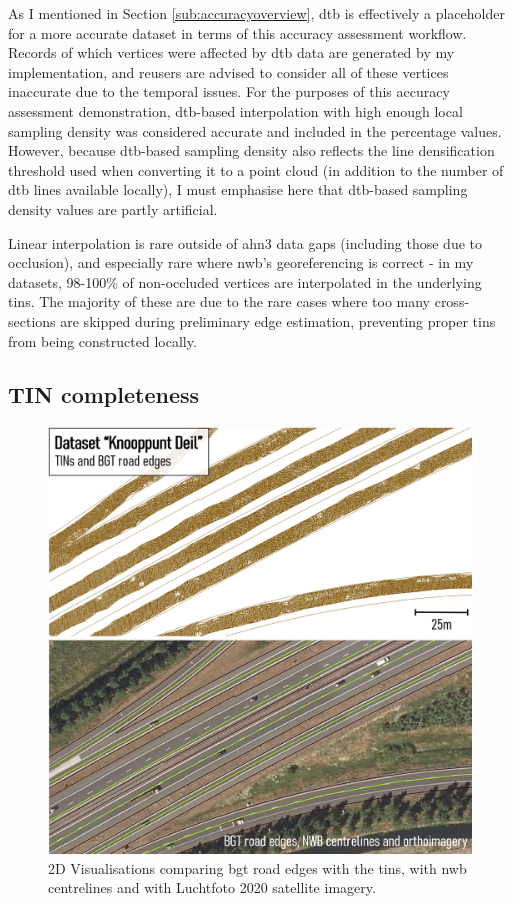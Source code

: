 As I mentioned in Section \ref{sub:accuracyoverview}, \ac{dtb} is effectively a placeholder for a more accurate dataset in terms of this accuracy assessment workflow. Records of which vertices were affected by \ac{dtb} data are generated by my implementation, and reusers are advised to consider all of these vertices inaccurate due to the temporal issues. For the purposes of this accuracy assessment demonstration, \ac{dtb}-based interpolation with high enough local sampling density was considered accurate and included in the percentage values. However, because \ac{dtb}-based sampling density also reflects the line densification threshold used when converting it to a point cloud (in addition to the number of \ac{dtb} lines available locally), I must emphasise here that \ac{dtb}-based sampling density values are partly artificial.

Linear interpolation is rare outside of \ac{ahn3} data gaps (including those due to occlusion), and especially rare where \ac{nwb}'s georeferencing is correct - in my datasets, 98-100\% of non-occluded vertices are interpolated in the underlying \ac{tin}s. The majority of these are due to the rare cases where too many cross-sections are skipped during preliminary edge estimation, preventing proper \ac{tin}s from being constructed locally.

\subsection{TIN completeness}
\label{sub:tincompleteness}

\begin{figure}[h]
    \centering
    \includegraphics[width=0.8\linewidth]{final_report/figs/bgtcomparison.png}
    \caption{2D Visualisations comparing \ac{bgt} road edges with the \ac{tin}s, with \ac{nwb} centrelines and with Luchtfoto 2020 satellite imagery.}
    \label{fig:bgtcomparison}
\end{figure}

